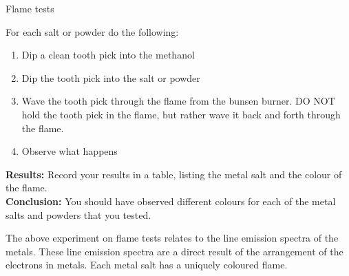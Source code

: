 \begin{i_experiment}{Flame tests}
{    For each salt or powder do the following: \label{m38741*id7092}\begin{enumerate}[noitemsep, label=\textbf{\arabic*}. ] 
            \item Dip a clean tooth pick into the methanol\item Dip the tooth pick into the salt or powder\item Wave the tooth pick through the flame from the bunsen burner. DO NOT hold the tooth pick in the flame, but rather wave it back and forth through the flame.\item Observe what happens\end{enumerate}
\label{m38741*eip-6993}\noindent{}\textbf{Results:}\newline
    Record your results in a table, listing the metal salt and the colour of the flame.
\\ 
\label{m38741*eip-6994}\noindent{}\textbf{Conclusion:}\newline
    You should have observed different colours for each of the metal salts and powders that you tested.}
\end{i_experiment}
The above experiment on flame tests relates to the line emission spectra of the metals. These line emission spectra are a direct result of the arrangement of the electrons in metals. Each metal salt has a uniquely coloured flame. \par \label{m38741*secfhsst!!!underscore!!!id766}

